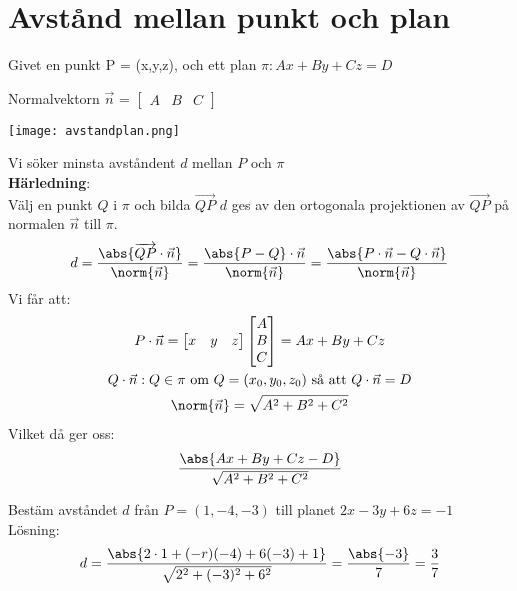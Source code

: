 \section{Avstånd mellan punkt och plan} %
\label{sec:avst_nd}
Givet en punkt P = (x,y,z), och ett plan $\pi : Ax + By + Cz =D$
\begin{Rem}
    Normalvektorn $\vec{n}$ = $\begin{bmatrix} A&B&C \end{bmatrix}$
\end{Rem}
\begin{center}
	\texttt{[image: avstandplan.png]}
\end{center}
Vi söker minsta avståndent $d$ mellan $P$ och $\pi$\\
\textbf{Härledning}:\\
Välj en punkt $Q$ i $\pi$ och bilda $\overrightarrow{QP}$ $d$ ges av den ortogonala projektionen av $\overrightarrow{QP}$ på normalen $\vec{n}$ till $\pi$.
\begin{gather*}
 	d = \frac{\abs{\overrightarrow{QP} \cdot \vec{n}}}{\norm{\vec{n}}} = \frac{\abs{P - Q} \cdot \vec{n}}{\norm{\vec{n}}} = \frac{\abs{P \cdot \vec{n} - Q \cdot \vec{n}}}{\norm{\vec{n}}}
 \end{gather*}
 Vi får att:
 \begin{gather*}
 	P \cdot \vec{n} = \begin{bmatrix} x&y&z \end{bmatrix} \begin{bmatrix} A\\B\\C \end{bmatrix} = Ax + By + Cz \\
 	Q \cdot \vec{n}: Q \in \pi \mbox{ om } Q = (x_0,y_0,z_0) \mbox{ så att } Q \cdot \vec{n} = D\\
 	\norm{\vec{n}} = \sqrt{A^2+B^2+C^2}
 \end{gather*}
 Vilket då ger oss:
 \[
     \frac{\abs{Ax+By+Cz-D}}{\sqrt{A^2+B^2+C^2}}
 \]
\begin{Ex}
    Bestäm avståndet $d$ från $P=(1,-4,-3)$ till planet $2x-3y+6z=-1$\\
    Lösning:
    \[
        d = \frac{\abs{2 \cdot 1 + (-r)(-4) + 6(-3) + 1}}{\sqrt{2^2 + (-3)^2 + 6^2}} = \frac{\abs{-3}}{7} = \frac{3}{7}
    \]
\end{Ex}


